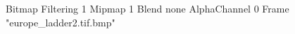{Bitmap
	{Filtering 1}
	{Mipmap 1}
	{Blend none}
	{AlphaChannel 0}
	{Frame "europe_ladder2.tif.bmp"}
}

